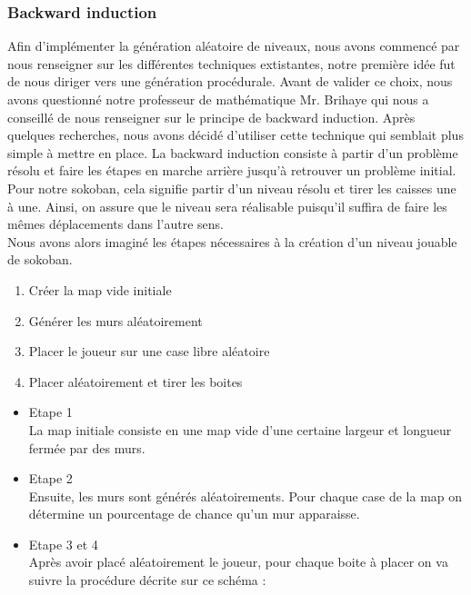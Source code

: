 \documentclass[../main.tex]{subfiles}
\begin{document}
\subsubsection{Backward induction}
Afin d'implémenter la génération aléatoire de niveaux, nous avons commencé par nous renseigner sur les différentes techniques extistantes, notre première idée fut de nous diriger vers une génération procédurale.
Avant de valider ce choix, nous avons questionné notre professeur de mathématique Mr. Brihaye qui nous a conseillé de nous renseigner sur le principe de backward induction.
Après quelques recherches, nous avons décidé d'utiliser cette technique qui semblait plus simple à mettre en place.
La backward induction consiste à partir d'un problème résolu et faire les étapes en marche arrière jusqu'à retrouver un problème initial.
Pour notre sokoban, cela signifie partir d'un niveau résolu et tirer les caisses une à une.
Ainsi, on assure que le niveau sera réalisable puisqu'il suffira de faire les mêmes déplacements dans l'autre sens.\\
Nous avons alors imaginé les étapes nécessaires à la création d'un niveau jouable de sokoban.
\begin{enumerate}
	\item Créer la map vide initiale 
	\item Générer les murs aléatoirement
	\item Placer le joueur sur une case libre aléatoire
	\item Placer aléatoirement et tirer les boites
\end{enumerate}
\begin{itemize}
	\item Etape 1\\
		  La map initiale consiste en une map vide d'une certaine largeur et longueur fermée par des murs.
	\item Etape 2\\
		  Ensuite, les murs sont générés aléatoirements. Pour chaque case de la map on détermine un pourcentage de chance qu'un mur apparaisse.
	\item Etape 3 et 4\\
		  Après avoir placé aléatoirement le joueur, pour chaque boite à placer on va suivre la procédure décrite sur ce schéma :\\
\end{itemize}
\end{document}
